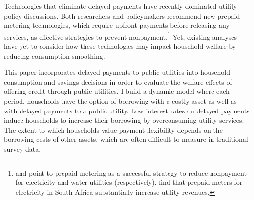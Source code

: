 \documentclass[12pt]{article}
\begin{document}
Technologies that eliminate delayed payments have recently dominated utility policy discussions.    Both researchers and policymakers recommend new prepaid metering technologies, which require upfront payments before releasing any services, as effective strategies to prevent nonpayment.\footnote{\cite{kojima2016making} and \cite{heymans2014limits} point to prepaid metering as a successful strategy to reduce nonpayment for electricity and water utilities (respectively).  \cite{jack2016charging} find that prepaid meters for electricity in South Africa substantially increase utility revenues.}    Yet, existing analyses have yet to consider how these technologies may impact household welfare by reducing consumption smoothing.

This paper incorporates delayed payments to public utilities into household consumption and savings decisions in order to evaluate the welfare effects of offering credit through public utilities.  I build a dynamic model where each period, households have the option of borrowing with a costly asset as well as with delayed payments to a public utility.  Low interest rates on delayed payments induce households to increase their borrowing by overconsuming utility services.  The extent to which households value payment flexibility depends on the borrowing costs of other assets, which are often difficult to measure in traditional survey data. 
\end{document}
